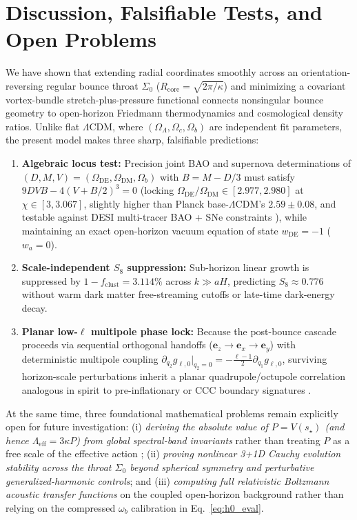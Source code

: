 \documentclass[pdflatex,sn-mathphys-num]{sn-jnl}
\theoremstyle{thmstyleone}
\theoremstyle{thmstyletwo}
\theoremstyle{thmstylethree}
\begin{document}
\section{Discussion, Falsifiable Tests, and Open Problems}\label{sec:discussion}

We have shown that extending radial coordinates smoothly across an orientation-reversing regular bounce throat $\Sigma_0$ ($R_{\mathrm{core}} = \sqrt{2\pi/\kappa}$) and minimizing a covariant vortex-bundle stretch-plus-pressure functional connects nonsingular bounce geometry to open-horizon Friedmann thermodynamics and cosmological density ratios. Unlike flat $\Lambda$CDM, where $(\Omega_\Lambda, \Omega_c, \Omega_b)$ are independent fit parameters, the present model makes three sharp, falsifiable predictions:
\begin{enumerate}
\item \textbf{Algebraic locus test:} Precision joint BAO and supernova determinations of $(D, M, V) = (\Omega_{\mathrm{DE}}, \Omega_{\mathrm{DM}}, \Omega_b)$ with $B = M - D/3$ must satisfy $9DVB - 4(V + B/2)^3 = 0$ (locking $\Omega_{\mathrm{DE}}/\Omega_{\mathrm{DM}} \in [2.977, 2.980]$ at $\chi \in [3, 3.067]$, slightly higher than Planck base-$\Lambda$CDM's $2.59 \pm 0.08$, and testable against DESI multi-tracer BAO + SNe constraints \cite{DESI2024}), while maintaining an exact open-horizon vacuum equation of state $w_{\mathrm{DE}} = -1$ ($w_a = 0$).
\item \textbf{Scale-independent $S_8$ suppression:} Sub-horizon linear growth is suppressed by $1 - f_{\mathrm{clust}} = 3.114\%$ across $k \gg aH$, predicting $S_8 \approx 0.776$ without warm dark matter free-streaming cutoffs or late-time dark-energy decay.
\item \textbf{Planar low-$\ell$ multipole phase lock:} Because the post-bounce cascade proceeds via sequential orthogonal handoffs ($\mathbf{e}_z \to \mathbf{e}_x \to \mathbf{e}_y$) with deterministic multipole coupling $\partial_{q_2}g_{\ell,0}|_{q_2=0} = -\frac{\ell-1}{2}\partial_{q_1}g_{\ell,0}$, surviving horizon-scale perturbations inherit a planar quadrupole/octupole correlation analogous in spirit to pre-inflationary or CCC boundary signatures \cite{Tod2015,GurzadyanPenrose2013}.
\end{enumerate}

At the same time, three foundational mathematical problems remain explicitly open for future investigation: (i) \emph{deriving the absolute value of $P = V(s_\star)$ (and hence $\Lambda_{\mathrm{eff}} = 3\kappa P$) from global spectral-band invariants} rather than treating $P$ as a free scale of the effective action \cite{Weinberg1989}; (ii) \emph{proving nonlinear 3+1D Cauchy evolution stability across the throat $\Sigma_0$ beyond spherical symmetry and perturbative generalized-harmonic controls}; and (iii) \emph{computing full relativistic Boltzmann acoustic transfer functions} on the coupled open-horizon background rather than relying on the compressed $\omega_b$ calibration in Eq.~\eqref{eq:h0_eval}.
\end{document}
